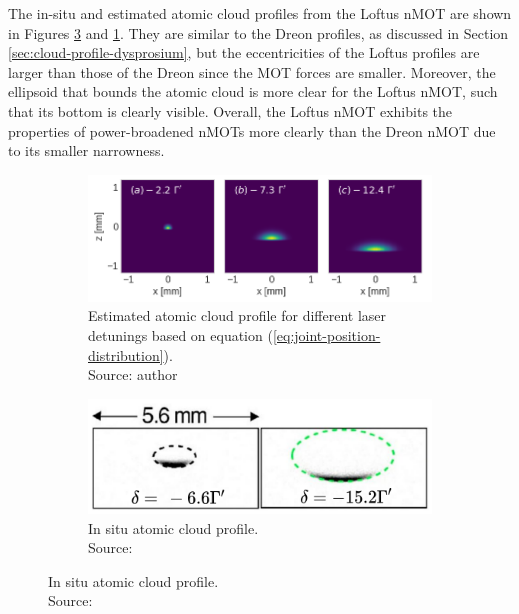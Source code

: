 The in-situ and estimated atomic cloud profiles from the Loftus nMOT are shown in Figures \ref{fig:Loftus-in-situ-atomic-cloud-profile} and \ref{fig:Loftus-simulated-atomic-cloud-profile}. They are similar to the Dreon profiles, as discussed in Section \ref{sec:cloud-profile-dysprosium}, but the eccentricities of the Loftus profiles are larger than those of the Dreon since the MOT forces are smaller. Moreover, the ellipsoid that bounds the atomic cloud is more clear for the Loftus nMOT, such that its bottom is clearly visible. Overall, the Loftus nMOT exhibits the properties of power-broadened nMOTs more clearly than the Dreon nMOT due to its smaller narrowness.
\begin{figure}[!ht]
    \centering
    \caption{In-situ and estimated atomic cloud profiles from Loftus nMOT}
    \begin{subfigure}[b]{0.58\linewidth}
        \centering
        \includegraphics[width=\textwidth]{USPSC-img/sr_loftus_cloud_profile.png}
        \caption{Estimated atomic cloud profile for different laser detunings based on equation (\ref{eq:joint-position-distribution}). \\ Source: author}
        \label{fig:Loftus-simulated-atomic-cloud-profile}
    \end{subfigure}
    \hfill
    \begin{subfigure}[b]{0.38\linewidth}
        \centering
        \includegraphics[width=\textwidth]{USPSC-img/loftus-atomic-cloud-profile.png}
        \caption{In situ atomic cloud profile. \\ Source: \cite{loftus2004narrow}}
        \vspace{40px}
        \label{fig:Loftus-in-situ-atomic-cloud-profile}
    \end{subfigure}
    \vspace{-20px}
\end{figure}

